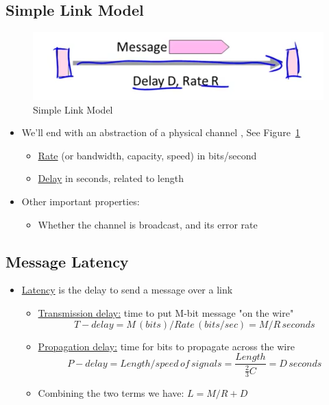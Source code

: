 \documentclass[12pt]{ctexart}   %
\begin{document}
	\subsection{Simple Link Model}
	
	\begin{figure}[h!] %
	 \centering
	 \includegraphics[scale=0.7]{images/2-1-2}
	\caption{ Simple Link Model}
	 \label{fig:2-1-2}
	 \end{figure}
	 
	\begin{itemize}
		\item We'll end with an abstraction of a physical channel , See Figure~\ref{fig:2-1-2}
		\begin{itemize}
			\item \underline{Rate} (or bandwidth, capacity, speed) in bits/second
			\item \underline{Delay} in seconds, related to length
		\end{itemize}
		
		\item Other important properties:
		\begin{itemize}
			\item Whether the channel is broadcast, and its error rate
		\end{itemize}
	\end{itemize}
	
	\subsection{Message Latency}
	\begin{itemize}
		\item \underline{Latency} is the delay to send a message over a link
		\begin{itemize}
			\item \underline{Transmission delay:} time to put M-bit message "on the wire" \\
			$$
			T-delay = M \, (bits) / Rate \, (bits/sec) = M/R \, seconds
			$$
			
			\item \underline{Propagation delay:} time for bits to propagate across the wire \\
			$$
			P-delay = Length /speed \, of \, signals = \frac{Length}{\frac{2}{3} C} = D \, seconds 
			$$			
			
			\item Combining the two terms we have: $L = M/R + D$
		\end{itemize}
		
	\end{itemize}
	
\end{document}
